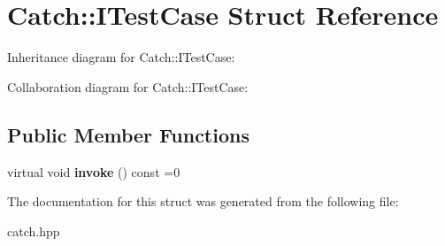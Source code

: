 \hypertarget{structCatch_1_1ITestCase}{}\section{Catch\+:\+:I\+Test\+Case Struct Reference}
\label{structCatch_1_1ITestCase}


Inheritance diagram for Catch\+:\+:I\+Test\+Case\+:


Collaboration diagram for Catch\+:\+:I\+Test\+Case\+:
\subsection*{Public Member Functions}
\begin{DoxyCompactItemize}
\item 
virtual void {\bfseries invoke} () const =0\hypertarget{structCatch_1_1ITestCase_a678825e62e7c17297621cfeb65588c34}{}\label{structCatch_1_1ITestCase_a678825e62e7c17297621cfeb65588c34}

\end{DoxyCompactItemize}


The documentation for this struct was generated from the following file\+:\begin{DoxyCompactItemize}
\item 
catch.\+hpp\end{DoxyCompactItemize}
